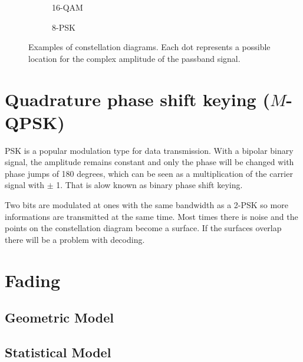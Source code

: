 \begin{figure}
	\hfill
	\begin{subfigure}{.4\linewidth}
		
		\caption{16-QAM\label{fig:qam-constellation}}
	\end{subfigure}
	\hfill
	\begin{subfigure}{.4\linewidth}
		
		\caption{8-PSK\label{fig:qpsk-constellation}}
	\end{subfigure}
	\hfill
	\caption{
		Examples of constellation diagrams. Each dot represents a possible location for the complex amplitude of the passband signal.
	}
\end{figure}

\section{Quadrature phase shift keying (\(M\)-QPSK)}

PSK is a popular modulation type for data transmission\cite{Meyer2011}. With a bipolar binary signal, the amplitude remains constant and only the phase will be changed with phase jumps of 180 degrees, which can be seen as a multiplication of the carrier signal with $\pm$ 1. That is alow known as binary phase shift keying.


Two bits are modulated at ones with the same bandwidth as a 2-PSK so more informations are transmitted at the same time. \cite{Meyer2011}
Most times there is noise and the points on the constellation diagram become a surface. 
If the surfaces overlap there will be a problem with decoding. 

\section{Fading}

\subsection{Geometric Model}


\subsection{Statistical Model}

